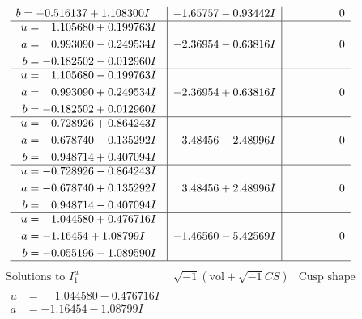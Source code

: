 \documentclass[1p]{elsarticle_modified}
\theoremstyle{definition}
\newcommand{\I}{\sqrt{-1}}
\begin{document}
$$\begin{array}{c|c|c}
\begin{aligned}
b &= -0.516137 + 1.108300 I\end{aligned}
 & -1.65757 - 0.93442 I & \phantom{-0.000000 } 0 \\ \hline\begin{aligned}
u &= \phantom{-}1.105680 + 0.199763 I \\
a &= \phantom{-}0.993090 - 0.249534 I \\
b &= -0.182502 - 0.012960 I\end{aligned}
 & -2.36954 - 0.63816 I & \phantom{-0.000000 } 0 \\ \hline\begin{aligned}
u &= \phantom{-}1.105680 - 0.199763 I \\
a &= \phantom{-}0.993090 + 0.249534 I \\
b &= -0.182502 + 0.012960 I\end{aligned}
 & -2.36954 + 0.63816 I & \phantom{-0.000000 } 0 \\ \hline\begin{aligned}
u &= -0.728926 + 0.864243 I \\
a &= -0.678740 - 0.135292 I \\
b &= \phantom{-}0.948714 + 0.407094 I\end{aligned}
 & \phantom{-}3.48456 - 2.48996 I & \phantom{-0.000000 } 0 \\ \hline\begin{aligned}
u &= -0.728926 - 0.864243 I \\
a &= -0.678740 + 0.135292 I \\
b &= \phantom{-}0.948714 - 0.407094 I\end{aligned}
 & \phantom{-}3.48456 + 2.48996 I & \phantom{-0.000000 } 0 \\ \hline\begin{aligned}
u &= \phantom{-}1.044580 + 0.476716 I \\
a &= -1.16454 + 1.08799 I \\
b &= -0.055196 - 1.089590 I\end{aligned}
 & -1.46560 - 5.42569 I & \phantom{-0.000000 } 0\\
 \hline 
 \end{array}$$\newpage$$\begin{array}{c|c|c}  
\text{Solutions to }I^u_{1}& \I (\text{vol} + \sqrt{-1}CS) & \text{Cusp shape}\\
 \hline 
\begin{aligned}
u &= \phantom{-}1.044580 - 0.476716 I \\
a &= -1.16454 - 1.08799 I \\

\end{aligned}
\end{array}$$
\end{document}
